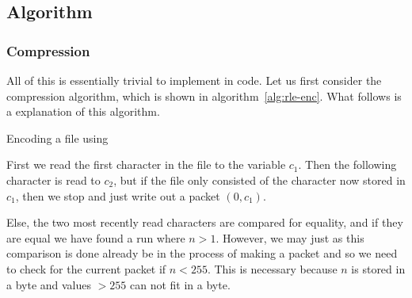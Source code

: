\subsection{Algorithm}

\subsubsection{Compression}

All of this is essentially trivial to implement in code. Let us first
consider the compression algorithm, which is shown in
algorithm~\ref{alg:rle-enc}. What follows is a explanation of this
algorithm.

\begin{algorithm}
  \caption{Encoding a file using \rle}
  \label{alg:rle-enc}
  \begin{algorithmic}[1]


    \While{\True}


    \If{\eof}
    \Break
    \EndIf

    \Else
    \State {}
    \State {}

    \EndIf

    \EndWhile

    \State {}
    \State {}
  \end{algorithmic}
\end{algorithm}

First we read the first character in the file to the variable
$c_1$. Then the following character is read to $c_2$, but if the file
only consisted of the character now stored in $c_1$, then we stop and
just write out a packet $(0,c_1)$.

Else, the two most recently read characters are compared for equality,
and if they are equal we have found a run where $n > 1$. However, we
may just as this comparison is done already be in the process of
making a packet and so we need to check for the current packet if $n <
255$. This is necessary because $n$ is stored in a byte and values $>
255$ can not fit in a byte.

